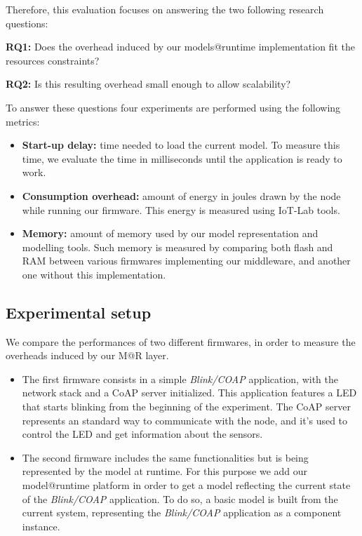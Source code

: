 
Therefore, this evaluation focuses on answering the two following research questions:

\textbf{RQ1:} Does the overhead induced by our models@runtime implementation fit the resources constraints?

\textbf{RQ2:} Is this resulting overhead small enough to allow scalability?


To answer these questions four experiments are performed using the following metrics:
\begin{itemize}
	\item \textbf{Start-up delay:} time needed to load the current model. To measure this time, we evaluate the time in milliseconds until the application is ready to work.
	\item \textbf{Consumption overhead:} amount of energy in joules drawn by the node while running our firmware.
	This energy is measured using IoT-Lab tools. 
	\item \textbf{Memory:} amount of memory used by our model representation and modelling tools.
	Such memory is measured by comparing both flash and RAM between various firmwares implementing our middleware, and another one without this implementation.
\end{itemize}

\subsection{Experimental setup}
We compare the performances of two different firmwares, in order to measure the overheads induced by our M@R layer.


\begin{itemize}
	\item The first firmware consists in a simple \emph{Blink/COAP} application, with the network stack and a CoAP server initialized.
	This application features a LED that starts blinking from the beginning of the experiment. The CoAP server represents an standard way to communicate with the node, and it's used to control the LED and get information about the sensors.
	\item The second firmware includes the same functionalities but is being represented by the model at runtime. For this purpose we add our model@runtime platform in order to get a model reflecting the current state of the \emph{Blink/COAP} application.
	To do so, a basic model is built from the current system, representing the \emph{Blink/COAP} application as a component instance.
\end{itemize}

